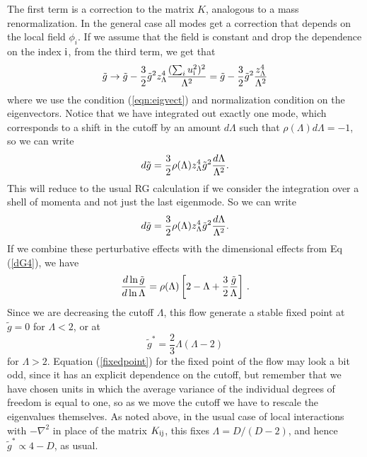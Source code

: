 \documentclass[aps,twocolumn,floats,nofootinbib,prl]{revtex4}
\begin{document}
The first term is a correction to the matrix $K$, analogous to a mass renormalization. In the general case all modes get a correction that depends on the local field $\phi_i$. If we assume
that the field is constant and drop the dependence on the index $\rm i$, from the third term, we get that
\begin{equation}
\tilde g \to \tilde g - \frac{3}{2} \tilde g^2 z_\Lambda^4 {{(\sum_i u_{\rm i}^2)^2 }\over {\Lambda^2}} =\tilde g - \frac{3}{2} \tilde g^2 \frac{z_\Lambda^4}{\Lambda^2}
\end{equation}
where we use the condition (\ref{eqn:eigvect}) and normalization condition on the eigenvectors. Notice that we have integrated out exactly one mode, which corresponds to a shift in the cutoff by an amount $d\Lambda$ such that $\rho(\Lambda)d\Lambda =-1$, so we can write
\begin{equation}
d \tilde g=  \frac{3}{2}\rho(\Lambda)  z_\Lambda^4 \tilde g^2 {{d\Lambda} \over {\Lambda^2}} .
\end{equation}
This will reduce to the usual RG calculation if we consider the integration over a shell of momenta and not just the last eigenmode. So we can write
\begin{equation}
d \tilde g =  \frac{3}{2}\rho(\Lambda)  z_\Lambda^4 \tilde g^2    {{d\Lambda} \over {\Lambda^2}} .
\end{equation}
If we combine these perturbative effects with the dimensional effects from Eq (\ref{dG4}),  we have
\begin{equation}
\frac{d\ln \tilde g}{d\ln\Lambda} = \rho(\Lambda) \left[  2   - \Lambda +    \frac{3}{2}  { \tilde g \over \Lambda} \right] \,.
\end{equation}
Since we are  decreasing the cutoff $\Lambda$, this flow generate a stable fixed point at $\tilde g  =0$ for $\Lambda < 2$, or at 
\begin{equation}
\tilde g^* = \frac{2}{3} \Lambda (\Lambda - 2)
\label{fixedpoint}
\end{equation}
for $\Lambda > 2$.
Equation (\ref{fixedpoint}) for the fixed point of the flow may look a bit odd, since it has an explicit dependence on the cutoff, but remember that we have chosen units in which the average variance of the individual degrees of freedom is equal to one, so as we move the cutoff we have to rescale the eigenvalues themselves.  As noted above, in the usual case of local interactions with $-\nabla^2$ in place of the matrix $K_{\rm ij}$, this fixes $\Lambda = D/(D-2)$, and hence $\tilde g^* \propto 4 -D$, as usual. 
\end{document}
